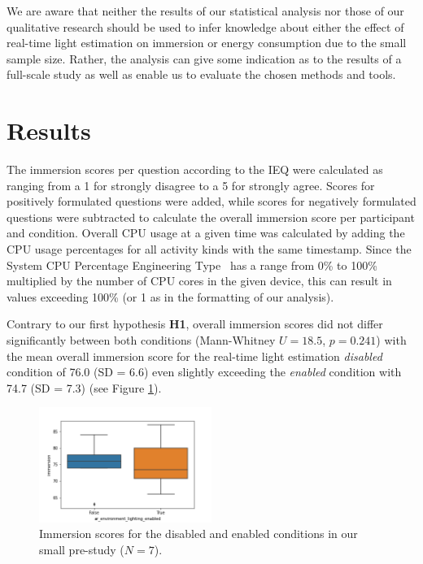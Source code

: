 \documentclass[12pt,twoside,english]{article}
\begin{document}
We are aware that neither the results of our statistical analysis nor those of our qualitative research should be used to infer knowledge about either the effect of real-time light estimation on immersion or energy consumption due to the small sample size.
Rather, the analysis can give some indication as to the results of a full-scale study as well as enable us to evaluate the chosen methods and tools.

\section{Results}
\label{sect:results}

The immersion scores per question according to the \gls{IEQ} were calculated as ranging from a 1 for strongly disagree to a 5 for strongly agree.
Scores for positively formulated questions were added, while scores for negatively formulated questions were subtracted to calculate the overall immersion score per participant and condition.
Overall \gls{CPU} usage at a given time was calculated by adding the \gls{CPU} usage percentages for all activity kinds with the same timestamp.
Since the System CPU Percentage Engineering Type~\cite{apple_system_2020} has a range from 0\% to 100\% multiplied by the number of \gls{CPU} cores in the given device, this can result in values exceeding 100\% (or 1 as in the formatting of our analysis).

Contrary to our first hypothesis \textbf{H1}, overall immersion scores did not differ significantly between both conditions (Mann-Whitney $ U = 18.5 $, $ p = 0.241 $) with the mean overall immersion score for the real-time light estimation \textit{disabled} condition of 76.0 (SD = 6.6) even slightly exceeding the \textit{enabled} condition with 74.7 (SD = 7.3) (see Figure \ref{fig:immersion_plot}).

\begin{figure}[h]
    \centering
    \includegraphics[width=0.5\textwidth]{imgs/immersion_plot}
    \caption{Immersion scores for the disabled and enabled conditions in our small pre-study ($ N = 7 $).}
    \label{fig:immersion_plot}
\end{figure}
\end{document}
